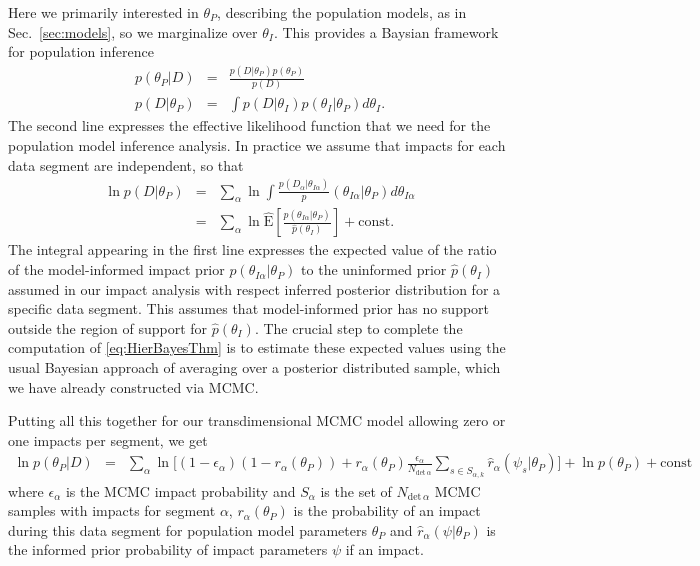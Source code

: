\documentclass[twocolumn, trackchanges]{aastex62}
\begin{document}
Here we primarily interested in $\theta_P$, describing the population models, as in Sec.~\ref{sec:models}, so we marginalize over $\theta_I$.  This provides a Baysian framework for population inference
\begin{eqnarray}
  p(\theta_P|D)&=&\frac{ p(D|\theta_P)p(\theta_P)}{p(D)}\label{eq:HierBayesThm}\\
  p(D|\theta_P)&=&\int p(D|\theta_I)p(\theta_I|\theta_P)d\theta_I\label{eq:metaLike}.
\end{eqnarray}
The second line expresses the effective likelihood function that we need for the population model inference analysis.
In practice we assume that impacts for each data segment are independent, so that
\begin{eqnarray}
  \ln {p(D|\theta_P)}&=&\sum_\alpha \ln\int \frac{p(D_\alpha|\theta_{I\alpha})}p(\theta_{I\alpha}|\theta_P)d\theta_{I\alpha}\\
  &=&\sum_\alpha \ln\hat{\mathrm{E}}\left[\frac{p(\theta_{I\alpha}|\theta_P)}{\hat p(\theta_I)}\right]+\mathrm{const}\label{eq:metaLikeSegmented}.
\end{eqnarray}
The integral appearing in the first line expresses the expected value of the ratio of the model-informed impact prior $p(\theta_{I\alpha}|\theta_P)$ to the uninformed prior $\hat p(\theta_{I})$ assumed in our impact analysis with respect inferred posterior distribution for a specific data segment.  This assumes that model-informed prior has no support outside the region of support for $\hat p(\theta_{I})$.
The crucial step to complete the computation of \eqref{eq:HierBayesThm} is to estimate these expected values using the usual Bayesian approach of averaging over a posterior distributed sample, which we have already constructed via MCMC.

Putting all this together for our transdimensional MCMC model allowing zero or one impacts per segment, we get
\begin{eqnarray}
  \ln p(\theta_P|D)&=& \sum_\alpha\ln\Big[ (1-\epsilon_\alpha)(1-r_\alpha(\theta_P))+r_\alpha(\theta_P)\frac{\epsilon_\alpha}{N_{\mathrm{det}\,\alpha}}\sum_{s\in S_{\alpha,k}}\hat r_\alpha(\psi_s|\theta_P)\Big]+\ln p(\theta_P)+\mathrm{const}\label{eq:HierPost}
\end{eqnarray}
where $\epsilon_\alpha$ is the MCMC impact probability and $S_{\alpha}$ is the set of $N_{\mathrm{det}\,\alpha}$ MCMC samples with impacts for segment $\alpha$, $r_\alpha(\theta_P)$ is the probability of an impact during this data segment for population model parameters $\theta_P$ and $\hat r_\alpha(\psi|\theta_P)$ is the informed prior probability of impact parameters $\psi$ if an impact.
\end{document}

